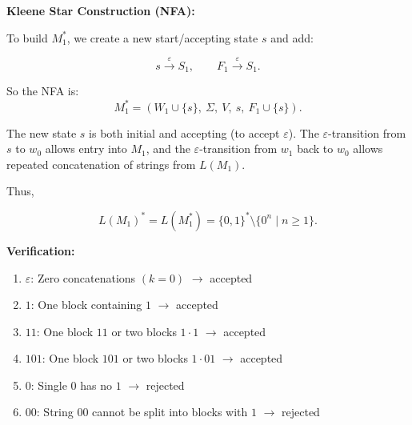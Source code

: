 \documentclass[12pt,a4paper,openany]{article}
\begin{document}
\textbf{Kleene Star Construction (NFA):}

To build $M_1^*$, we create a new start/accepting state $s$ and add:

\[
s \xrightarrow{\varepsilon} S_1,\qquad
F_1 \xrightarrow{\varepsilon} S_1.
\]

So the NFA is:
\[
M_1^* = (W_1 \cup \{s\},\ \Sigma,\ V,\ s,\ F_1 \cup \{s\}).
\]

\begin{center}
\end{center}

The new state $s$ is both initial and accepting (to accept $\varepsilon$). The $\varepsilon$-transition from $s$ to $w_0$ allows entry into $M_1$, and the $\varepsilon$-transition from $w_1$ back to $w_0$ allows repeated concatenation of strings from $L(M_1)$.

Thus,

\[
L(M_1)^* = L(M_1^*) = \{0,1\}^* \setminus \{0^n \mid n \ge 1\}.
\]

\textbf{Verification:}

\begin{enumerate}
    \item $\varepsilon$: Zero concatenations $(k=0)$ $\to$ accepted
    \item $1$: One block containing $1$ $\to$ accepted
    \item $11$: One block $11$ or two blocks $1 \cdot 1$ $\to$ accepted
    \item $101$: One block $101$ or two blocks $1 \cdot 01$ $\to$ accepted
    \item $0$: Single $0$ has no $1$ $\to$ rejected
    \item $00$: String $00$ cannot be split into blocks with $1$ $\to$ rejected
\end{enumerate}
\end{document}
